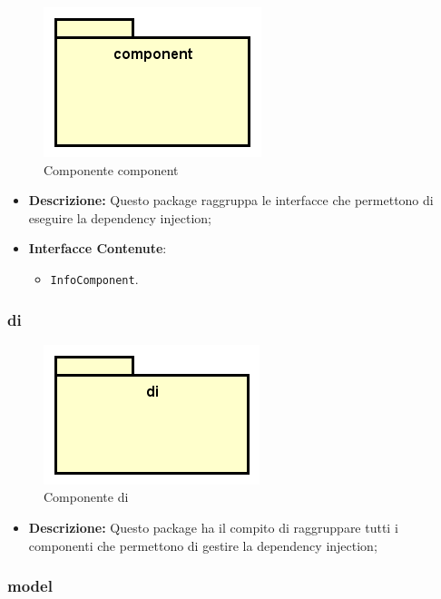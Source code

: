 \documentclass[../DefinizioneDiProdotto.tex]{subfiles}
\begin{document}
\begin{figure}[H]
	\centering
	\includegraphics[width=\maxwidth]{img/package/component.png}
	\caption{Componente component}\label{fig:component} 
\end{figure}
\begin{itemize}
	\item \textbf{Descrizione:} Questo package raggruppa le interfacce che permettono di eseguire la dependency injection;
	\item \textbf{Interfacce Contenute}:
	\begin{itemize}
		\item \texttt{InfoComponent}.
		
	\end{itemize}
\end{itemize}

\subsubsection{di}

\begin{figure}[H]
	\centering
	\includegraphics[width=\maxwidth]{img/package/di.png}
	\caption{Componente di}\label{fig:di} 
\end{figure}
\begin{itemize}
	\item \textbf{Descrizione:} Questo package ha il compito di raggruppare tutti i componenti che permettono di gestire la dependency injection;
\end{itemize}

\subsubsection{model}
\end{document}
